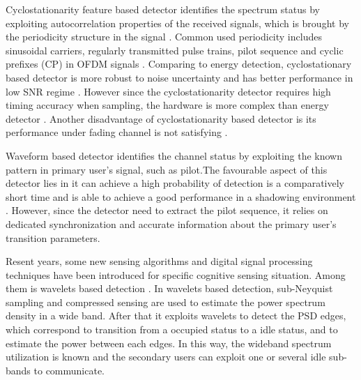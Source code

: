 Cyclostationarity feature based detector identifies the spectrum status by exploiting autocorrelation properties of the received signals, which is brought by the periodicity structure in the signal \cite{goldsmith2009breaking}. Common used periodicity includes sinusoidal carriers,  regularly transmitted pulse trains, pilot sequence and cyclic prefixes (CP) in OFDM signals \cite{akyildiz2011cooperative, umar2013comparative}.  
Comparing to energy detection, cyclostationary based detector is more robust to noise uncertainty and has better performance in low SNR regime \cite{umar2013comparative}. However since the cyclostationarity detector requires high timing accuracy when sampling, the hardware is more complex than energy detector \cite{yucek2009survey}. Another disadvantage of cyclostationarity based detector is its performance under fading channel is not satisfying \cite{tandra2007snr}.   

Waveform based detector identifies the channel status by exploiting the known pattern in primary user's signal, such as pilot.The favourable aspect of this detector lies in it can achieve a high probability of detection is a comparatively short time and is able to achieve a good performance in a shadowing environment \cite{tang2005some}. However, since the detector need to extract the pilot sequence, it relies on dedicated synchronization and accurate information about the primary user's transition parameters.  


Resent years, some new sensing algorithms and digital signal processing techniques have been introduced for specific cognitive sensing situation. Among them is wavelets based detection \cite{tian2007compressed, sun2013wideband, sun2013wideband2}. In wavelets based detection, sub-Neyquist sampling and compressed sensing are used to estimate the power spectrum density in a wide band. After that it exploits wavelets to detect the PSD edges, which correspond to transition from a occupied status to a idle status, and to estimate the power between each edges. In this way, the wideband spectrum utilization is known and the secondary users can exploit one or several idle sub-bands to communicate. 

